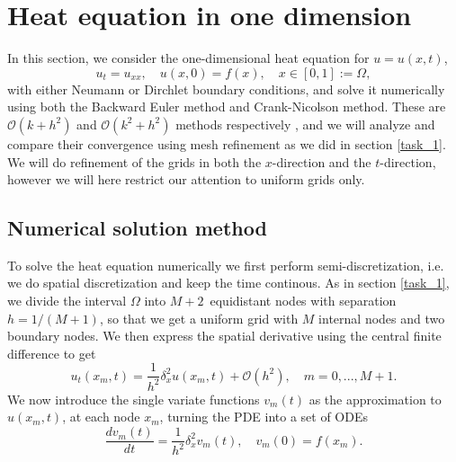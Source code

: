 \section{Heat equation in one dimension}
\label{heat-equation}
In this section, we consider the one-dimensional heat equation for $u = u(x, t)$, 
\begin{equation*}
    u_t = u_{xx}, \quad u(x, 0) = f(x), \quad x \in [0,1] := \Omega, 
    \label{eq:heat-eq}
\end{equation*}
with either Neumann or Dirchlet boundary conditions, 
and solve it numerically using both the Backward Euler method and Crank-Nicolson method. 
These are $\mathcal{O}(k+h^2)$ and $\mathcal{O}(k^2+h^2)$ methods respectively \cite{owren}, 
and we will analyze and compare their convergence using mesh refinement as we did in section \ref{task_1}. 
We will do refinement of the grids in both the $x$-direction and the $t$-direction, 
however we will here restrict our attention to uniform grids only. 

\subsection{Numerical solution method}
To solve the heat equation numerically we first perform semi-discretization, 
i.e. we do spatial discretization and keep the time continous. 
As in section \ref{task_1}, 
we divide the interval $\Omega$ into $M+2$ equidistant nodes with separation $h=1/(M+1)$, 
so that we get a uniform grid with $M$ internal nodes and two boundary nodes. 
We then express the spatial derivative using the central finite difference to get 
\begin{equation*}
    u_t(x_m, t) = \frac{1}{h^2} \delta_x^2 u(x_m, t) + \mathcal{O}(h^2), 
    \quad m = 0,...,M+1.
\end{equation*}
We now introduce the single variate functions $v_m(t)$ as the approximation to $u(x_m, t)$, 
at each node $x_m$, 
turning the PDE into a set of ODEs 
\begin{equation*}
    \frac{dv_m(t)}{dt} = \frac{1}{h^2} \delta_x^2 v_m(t), 
    \quad v_m(0) = f(x_m). 
\end{equation*}


